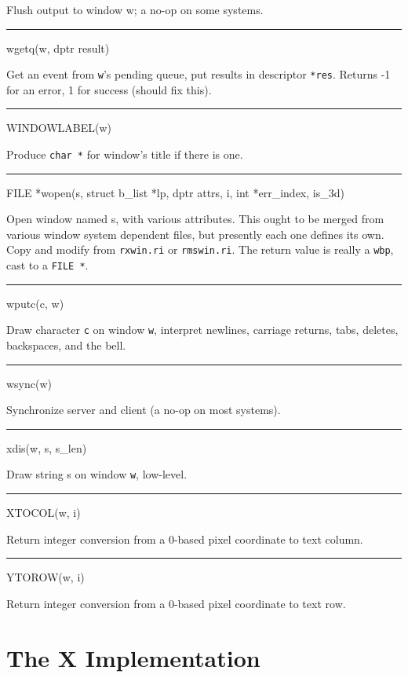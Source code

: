 Flush output to window w; a no-op on some systems.


\bigskip\hrule\vspace{0.1cm}
\noindent
wgetq(w, dptr result)


Get an event from \texttt{w}{}'s pending queue, put results in
descriptor \texttt{*res}. Returns -1 for an error, 1 for success
(should fix this).


\bigskip\hrule\vspace{0.1cm}
\noindent
WINDOWLABEL(w)


Produce \texttt{char *} for window's title if there is one.

\bigskip\hrule\vspace{0.1cm}
\noindent



FILE *wopen(s, struct b\_list *lp, dptr attrs, i, int *err\_index, is\_3d)


Open window named s, with various attributes. This ought to be merged
from various window system dependent files, but presently each one
defines its own. Copy and modify from \texttt{rxwin.ri} or
\texttt{rmswin.ri}. The return value is really a \texttt{wbp}, cast to
a \texttt{FILE *}.


\bigskip\hrule\vspace{0.1cm}
\noindent
wputc(c, w)


Draw character \texttt{c} on window \texttt{w}, interpret newlines,
carriage returns, tabs, deletes, backspaces, and the bell.


\bigskip\hrule\vspace{0.1cm}
\noindent
wsync(w)

Synchronize server and client (a no-op on most systems).


\bigskip\hrule\vspace{0.1cm}
\noindent
xdis(w, s, s\_len)


Draw string s on window \texttt{w}, low-level.


\bigskip\hrule\vspace{0.1cm}
\noindent
XTOCOL(w, i)


Return integer conversion from a 0-based pixel coordinate to text column.


\bigskip\hrule\vspace{0.1cm}
\noindent
YTOROW(w, i)


Return integer conversion from a 0-based pixel coordinate to text row.

\section{The X Implementation}

